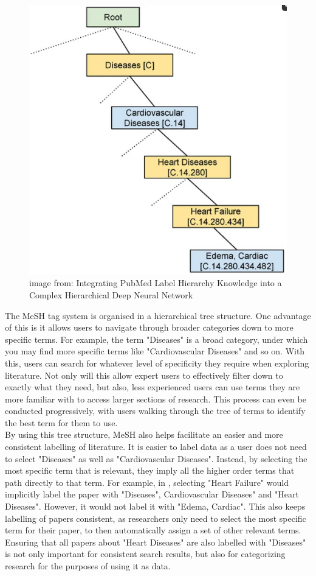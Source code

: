 \documentclass{l4proj}
\begin{document}
\begin{figure}[h]
    \centering
    \includegraphics[width=0.6\linewidth]{images/mesh_label.png}
    \caption{image from: Integrating PubMed Label Hierarchy Knowledge into a Complex Hierarchical Deep Neural Network}
    \label{fig:mesh}
\end{figure}

 The MeSH tag system is organised in a hierarchical tree structure. One advantage of this is it allows users to navigate through broader categories down to more specific terms. For example, the term "Diseases" is a broad category, under which you may find more specific terms like "Cardiovascular Diseases" and so on. With this, users can search for whatever level of specificity they require when exploring literature. Not only will this allow expert users to effectively filter down to exactly what they need, but also, less experienced users can use terms they are more familiar with to access larger sections of research. This process can even be conducted progressively, with users walking through the tree of terms to identify the best term for them to use. \\

 By using this tree structure, MeSH also helps facilitate an easier and more consistent labelling of literature. It is easier to label data as a user does not need to select "Diseases" as well as "Cardiovascular Diseases". Instead, by selecting the most specific term that is relevant, they imply all the higher order terms that path directly to that term. For example, in  , selecting "Heart Failure" would implicitly label the paper with "Diseases", Cardiovascular Diseases" and "Heart Diseases". However, it would not label it with "Edema, Cardiac". This also keeps labelling of papers consistent, as researchers only need to select the most specific term for their paper, to then automatically assign a set of other relevant terms. Ensuring that all papers about "Heart Diseases" are also labelled with "Diseases" is not only important for consistent search results, but also for categorizing research for the purposes of using it as data. \\
\end{document}

